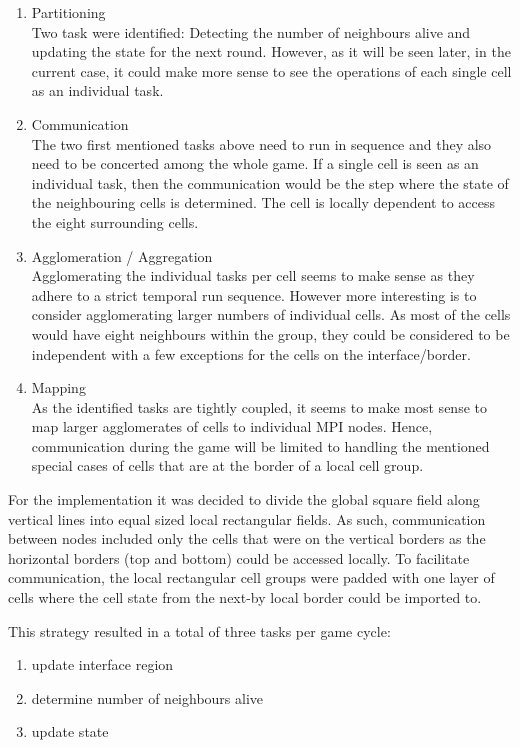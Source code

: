 \documentclass[a4paper,11pt,twoside]{article}
\begin{document}
\begin{enumerate}
\item Partitioning\\
Two task were identified: Detecting the number of neighbours alive and updating the state for the next round. However, as it will be seen later, in the current case, it could make more sense to see the operations of each single cell as an individual task.
\item Communication\\
The two first mentioned tasks above need to run in sequence and they also need to be concerted among the whole game. If a single cell is seen as an individual task, then the communication would be the step where the state of the neighbouring cells is determined. The cell is locally dependent to access the eight surrounding cells. 
\item Agglomeration / Aggregation\\
Agglomerating the individual tasks per cell seems to make sense as they adhere to a strict temporal run sequence. However more interesting is to consider agglomerating larger numbers of individual cells. As most of the cells would have eight neighbours within the group, they could be considered to be independent with a few exceptions for the cells on the interface/border. 
\item Mapping\\
As the identified tasks are tightly coupled, it seems to make most sense to map larger agglomerates of cells to individual MPI nodes. Hence, communication during the game will be limited to handling the mentioned special cases of cells that are at the border of a local cell group. 
\end{enumerate}

For the implementation it was decided to divide the global square field along vertical lines into equal sized local rectangular fields. As such, communication between nodes included only the cells that were on the vertical borders as the horizontal borders (top and bottom) could be accessed locally. To facilitate communication, the local rectangular cell groups were padded with one layer of cells where the cell state from the next-by local border could be imported to.

This strategy resulted in a total of three tasks per game cycle:
\begin{enumerate}
\item update interface region
\item determine number of neighbours alive
\item update state
\end{enumerate}
\end{document}
